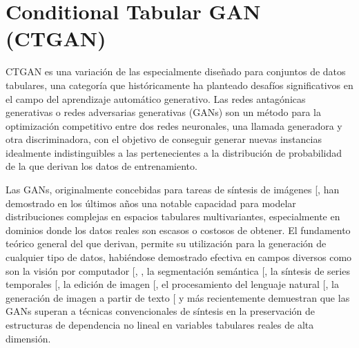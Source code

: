 \documentclass[a4paper,10pt,spanish]{jupyterBook}
\begin{document}
\section{Conditional Tabular GAN (CTGAN)}
\label{\detokenize{content/02/CTGAN:conditional-tabular-gan-ctgan}}\label{\detokenize{content/02/CTGAN::doc}}
\sphinxAtStartPar
CTGAN es una variación de las  especialmente diseñado para conjuntos de datos tabulares, una categoría que históricamente ha planteado desafíos significativos en el campo del aprendizaje automático generativo. Las redes antagónicas generativas o redes adversarias generativas (GANs) son un método para la optimización competitivo entre dos redes neuronales, una llamada generadora y otra discriminadora, con el objetivo de conseguir generar nuevas instancias idealmente indistinguibles a las pertenecientes a la distribución de probabilidad de la que derivan los datos de entrenamiento.

\sphinxAtStartPar
Las GANs, originalmente concebidas para tareas de síntesis de imágenes {[}\sphinxhref{https://doi.org/10.1145/3422622}{Goodfellow et al., 2014}{]}, han demostrado en los últimos años una notable capacidad para modelar distribuciones complejas en espacios tabulares multivariantes, especialmente en dominios donde los datos reales son escasos o costosos de obtener. El fundamento teórico general del que derivan, permite su utilización para la generación de cualquier tipo de datos, habiéndose demostrado efectiva en campos diversos como son la visión por computador {[}, \sphinxhref{https://doi.org/10.48550/arXiv.1710.10196}{Karras et al., 2017}{]}, la segmentación semántica {[}\sphinxhref{https://doi.org/10.48550/arXiv.1711.03213}{Hoffman et al., 2017}{]}, la síntesis de series temporales {[}\sphinxhref{https://doi.org/10.48550/arXiv.1806.01875}{Hartmann et al., 2018}{]}, la edición de imagen {[}\sphinxhref{https://doi.org/10.1145/3447648}{Abdal et al., 2020}{]}, el procesamiento del lenguaje natural {[}\sphinxhref{https://doi.org/10.48550/arXiv.1801.07736}{Fedus et al., 2018}{]}, la generación de imagen a partir de texto {[}\sphinxhref{https://doi.org/10.48550/arXiv.2103.00020}{Radford et al., 2021}{]} y más recientemente  demuestran que las GANs superan a técnicas convencionales de síntesis en la preservación de estructuras de dependencia no lineal en variables tabulares reales de alta dimensión.
\end{document}

